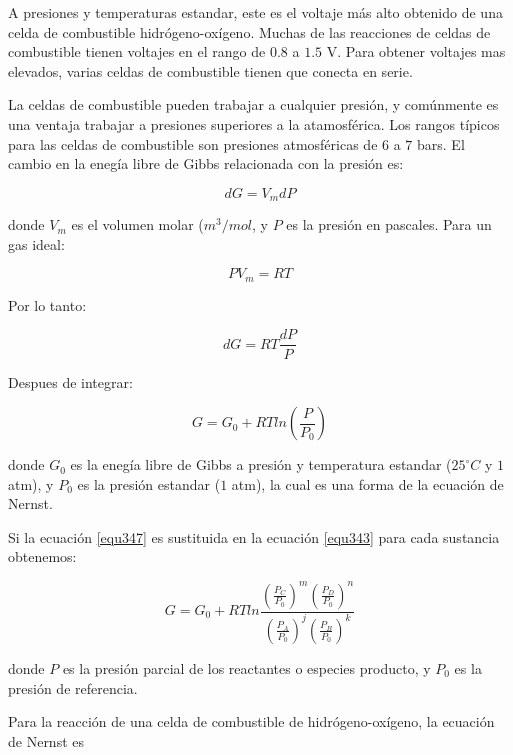 \documentclass[12pt]{book}
\theoremstyle{definition}
\theoremstyle{remark}
\theoremstyle{plain}
\begin{document}
A presiones y temperaturas estandar, este es el voltaje más alto obtenido
de una celda de combustible hidrógeno-oxígeno. Muchas de las reacciones
de celdas de combustible tienen voltajes en el rango de $0.8$ a $1.5$ V. Para obtener 
voltajes mas elevados, varias celdas de combustible tienen que conecta en serie.

La celdas de combustible pueden trabajar a cualquier presión, y comúnmente es una
ventaja trabajar a presiones superiores a la atamosférica. Los rangos típicos para 
las celdas de combustible son presiones atmosféricas de $6$ a $7$ bars. El cambio en 
la enegía libre de Gibbs relacionada con la presión es:

\begin{equation}
 \label{equ344}
d G = V_m dP
\end{equation}

donde $V_m$ es el volumen molar ($m^3/mol$, y $P$ es la presión en pascales. Para un
gas ideal:

\begin{equation}
 \label{equ345}
P V_m = R T
\end{equation}

Por lo tanto:

\begin{equation}
 \label{equ346}
dG = RT \frac{dP}{P}
\end{equation}

Despues de integrar:

\begin{equation}
 \label{equ347}
G=G_0 + RT ln \left( \frac{P}{P_0} \right)
\end{equation}

donde $G_0$ es la enegía libre de Gibbs a presión y temperatura estandar ($25^\circ C$
y $1$ atm), y $P_0$ es la presión estandar ($1$ atm), la cual es una forma de 
la ecuación de Nernst.

Si la ecuación \ref{equ347} es sustituida en la ecuación \ref{equ343} para cada sustancia
obtenemos:

\begin{equation}
 \label{equ348}
G= G_0 + R T ln \frac{\left ( \frac{P_C}{P_0} \right )^m \left ( \frac{P_D}{P_0} \right )^n}{\left ( \frac{P_A}{P_0} \right )^j \left ( \frac{P_B}{P_0} \right )^k}
\end{equation}

donde $P$ es la presión parcial de los reactantes o especies producto, y $P_0$ es 
la presión de referencia.

Para la reacción de una celda de combustible de hidrógeno-oxígeno, la ecuación
de Nernst es
\end{document}
